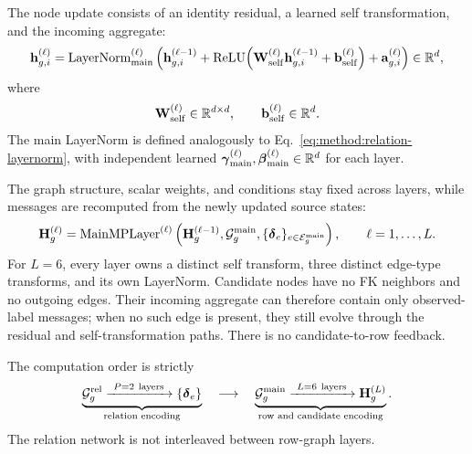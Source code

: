 The node update consists of an identity residual, a learned self
transformation, and the incoming aggregate:
\begin{equation}
  \mathbf h_{g,i}^{(\ell)}
  =
  \operatorname{LayerNorm}_{\mathrm{main}}^{(\ell)}
  \left(
    \mathbf h_{g,i}^{(\ell-1)}
    +\operatorname{ReLU}\!\left(
      \mathbf W_{\mathrm{self}}^{(\ell)}
      \mathbf h_{g,i}^{(\ell-1)}
      +\mathbf b_{\mathrm{self}}^{(\ell)}
    \right)
    +\mathbf a_{g,i}^{(\ell)}
  \right)
  \in\mathbb{R}^d,
\label{eq:method:main-update}
\end{equation}
where
\begin{equation}
  \mathbf W_{\mathrm{self}}^{(\ell)}\in\mathbb{R}^{d\times d},
  \qquad
  \mathbf b_{\mathrm{self}}^{(\ell)}\in\mathbb{R}^d.
\label{eq:method:main-self-parameter-domains}
\end{equation}
The main LayerNorm is defined analogously to
Eq.~\eqref{eq:method:relation-layernorm}, with independent learned
\(\boldsymbol\gamma_{\mathrm{main}}^{(\ell)},
\boldsymbol\beta_{\mathrm{main}}^{(\ell)}\in\mathbb{R}^d\) for each layer.

The graph structure, scalar weights, and conditions stay fixed across
layers, while messages are recomputed from the newly updated source states:
\begin{equation}
  \mathbf H_g^{(\ell)}
  =
  \operatorname{MainMPLayer}^{(\ell)}
  \left(
    \mathbf H_g^{(\ell-1)},
    \mathcal G_g^{\mathrm{main}},
    \{\boldsymbol\delta_e\}_{e\in\mathcal E_g^{\mathrm{main}}}
  \right),
  \qquad \ell=1,\ldots,L.
\label{eq:method:main-layer-stack}
\end{equation}
For \(L=6\), every layer owns a distinct self transform, three distinct
edge-type transforms, and its own LayerNorm. Candidate nodes have no FK
neighbors and no outgoing edges. Their incoming aggregate can therefore
contain only observed-label messages; when no such edge is present, they
still evolve through the residual and self-transformation paths. There is
no candidate-to-row feedback.

The computation order is strictly
\begin{equation}
  \underbrace{\mathcal G_g^{\mathrm{rel}}
  \xrightarrow{\ P=2\ \text{layers}\ }
  \{\boldsymbol\delta_e\}}_{\text{relation encoding}}
  \quad\longrightarrow\quad
  \underbrace{\mathcal G_g^{\mathrm{main}}
  \xrightarrow{\ L=6\ \text{layers}\ }
  \mathbf H_g^{(L)}}_{\text{row and candidate encoding}}.
\label{eq:method:two-stage-propagation}
\end{equation}
The relation network is not interleaved between row-graph layers.

